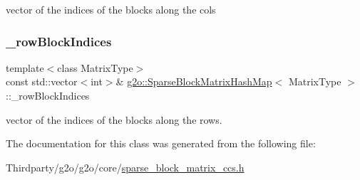 vector of the indices of the blocks along the cols 

\mbox{\label{classg2o_1_1_sparse_block_matrix_hash_map_ab002c32872fbce7d3485a5032eaee0de}} 
\subsubsection{\texorpdfstring{\+\_\+row\+Block\+Indices}{\_rowBlockIndices}}
{\footnotesize\ttfamily template$<$class Matrix\+Type$>$ \\
const std\+::vector$<$int$>$\& \mbox{\hyperlink{classg2o_1_1_sparse_block_matrix_hash_map}{g2o\+::\+Sparse\+Block\+Matrix\+Hash\+Map}}$<$ Matrix\+Type $>$\+::\+\_\+row\+Block\+Indices\hspace{0.3cm}{\ttfamily [protected]}}



vector of the indices of the blocks along the rows. 



The documentation for this class was generated from the following file\+:\begin{DoxyCompactItemize}
\item 
Thirdparty/g2o/g2o/core/\mbox{\hyperlink{sparse__block__matrix__ccs_8h}{sparse\+\_\+block\+\_\+matrix\+\_\+ccs.\+h}}\end{DoxyCompactItemize}
